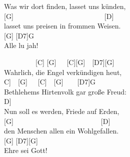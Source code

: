 \documentclass[
  letterpaper,
  a5paper]{memoir}
\begin{document}
Was wir dort finden, lasset uns künden,\\
{[}G{]}~~~~~~~~~~~~~~~~~~~~~~~~~~{[}D{]}\\
lasset uns preisen in frommen Weisen.\\
{[}G{]} {[}D7{]}G\\
Alle lu jah!

~~~~~~~~~{[}C{]} {[}G{]}~~~{[}C{]}{[}G{]}~~{[}D7{]}{[}G{]}\\
Wahrlich, die Engel verkündigen heut,\\
\hspace*{0.333em}\hspace*{0.333em}\hspace*{0.333em}\hspace*{0.333em}\hspace*{0.333em}{[}C{]}~~{[}G{]}~~~{[}C{]}~~{[}G{]}~~~~{[}D7{]}G\\
Bethlehems Hirtenvolk gar große Freud:\\
\hspace*{0.333em}\hspace*{0.333em}\hspace*{0.333em}\hspace*{0.333em}\hspace*{0.333em}\hspace*{0.333em}\hspace*{0.333em}\hspace*{0.333em}\hspace*{0.333em}\hspace*{0.333em}\hspace*{0.333em}\hspace*{0.333em}\hspace*{0.333em}\hspace*{0.333em}\hspace*{0.333em}\hspace*{0.333em}\hspace*{0.333em}\hspace*{0.333em}\hspace*{0.333em}\hspace*{0.333em}\hspace*{0.333em}\hspace*{0.333em}\hspace*{0.333em}\hspace*{0.333em}\hspace*{0.333em}\hspace*{0.333em}\hspace*{0.333em}\hspace*{0.333em}\hspace*{0.333em}\hspace*{0.333em}{[}D{]}\\
Nun soll es werden, Friede auf Erden,\\
{[}G{]}~~~~~~~~~~~~~~~~~~~~~~~~~{[}D{]}\\
den Menschen allen ein Wohlgefallen.\\
{[}G{]} {[}D7{]}{[}G{]}\\
Ehre sei Gott!
\end{document}
